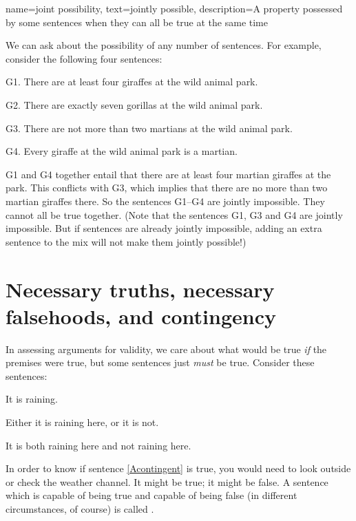 {
name=joint possibility,
text={jointly possible},
description={A property possessed by some sentences when they can all be true at the same time}
}

We can ask about the possibility of any number of sentences. For example, consider the following four sentences:
	\begin{ebullet}	
		\item[G1.] \label{MartianGiraffes} There are at least four giraffes at the wild animal park.
		\item[G2.] There are exactly seven gorillas at the wild animal park.
		\item[G3.] There are not more than two martians at the wild animal park.
		\item[G4.] Every giraffe at the wild animal park is a martian.
	\end{ebullet}
G1 and G4 together entail that there are at least four martian giraffes at the park. This conflicts with G3, which implies that there are no more than two martian giraffes there. So the sentences G1--G4 are jointly impossible. They cannot all be true together. (Note that the sentences G1, G3 and G4 are jointly impossible. But if sentences are already jointly impossible, adding an extra sentence to the mix will not make them jointly possible!)

\section[Necessary truths, falsehoods, and contingency]{Necessary truths, necessary falsehoods, and contingency}

In assessing arguments for validity, we care about what would be true \emph{if} the premises were true, but some sentences just \emph{must} be true. Consider these sentences:
	\begin{earg}
		\item[\ex{Acontingent}] It is raining.
		\item[\ex{Atautology}] Either it is raining here, or it is not.
		\item[\ex{Acontradiction}] It is both raining here and not raining here.
	\end{earg}
In order to know if sentence \ref{Acontingent} is true, you would need to look outside or check the weather channel. It might be true; it might be false. A sentence which is capable of being true and capable of being false (in different circumstances, of course) is called .

